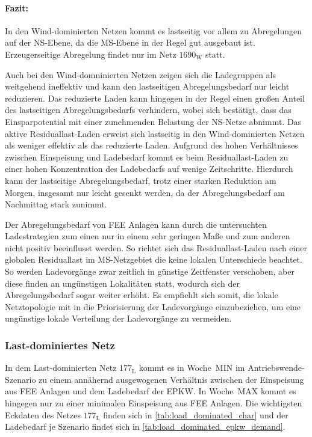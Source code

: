 \paragraph{Fazit:}

In den Wind-dominierten Netzen kommt es lastseitig vor allem zu Abregelungen auf der \gls{NS}-Ebene, da die \gls{MS}-Ebene in der Regel gut ausgebaut ist.
Erzeugerseitige Abregelung findet nur im Netz \(1690_{\text{W}}\) statt.\medskip

Auch bei den Wind-domninierten Netzen zeigen sich die Ladegruppen als weitgehend ineffektiv und kann den lastseitigen Abregelungsbedarf nur leicht reduzieren.
Das reduzierte Laden kann hingegen in der Regel einen großen Anteil des lastseitigen Abregelungsbedarfs verhindern, wobei sich bestätigt, dass das Einsparpotential mit einer zunehmenden Belastung der \gls{NS}-Netze abnimmt.
Das aktive Residuallast-Laden erweist sich lastseitig in den Wind-dominierten Netzen als weniger effektiv als das reduzierte Laden.
Aufgrund des hohen Verhältnisses zwischen Einspeisung und Ladebedarf kommt es beim Residuallast-Laden zu einer hohen Konzentration des Ladebedarfs auf wenige Zeitschritte.
Hierdurch kann der lastseitige Abregelungsbedarf, trotz einer starken Reduktion am Morgen, insgesamt nur leicht gesenkt werden, da der Abregelungsbedarf am Nachmittag stark zunimmt.\medskip

Der Abregelungsbedarf von \gls{FEE} Anlagen kann durch die untersuchten Ladestrategien zum einen nur in einem sehr geringen Maße und zum anderen nicht positiv beeinflusst werden.
So richtet sich das Residuallast-Laden nach einer globalen Residuallast im \gls{MS}-Netzgebiet die keine lokalen Unterschiede beachtet.
So werden Ladevorgänge zwar zeitlich in günstige Zeitfenster verschoben, aber diese finden an ungünstigen Lokalitäten statt, wodurch sich der Abregelungsbedarf sogar weiter erhöht.
Es empfiehlt sich somit, die lokale Netztopologie mit in die Priorisierung der Ladevorgänge einzubeziehen, um eine ungünstige lokale Verteilung der Ladevorgänge zu vermeiden.


\subsubsection{Last-dominiertes Netz}

In dem Last-dominierten Netz \(177_{\text{L}}\) kommt es in Woche~MIN im Antriebswende-Szenario zu einem annähernd ausgewogenen Verhältnis zwischen der Einspeisung aus \gls{FEE} Anlagen und dem Ladebedarf der \gls{EPKW}.
In Woche~MAX kommt es hingegen nur zu einer minimalen Einspeisung aus \gls{FEE} Anlagen.
Die wichtigsten Eckdaten des Netzes \(177_{\text{L}}\) finden sich in \autoref{tab:load_dominated_char} und der Ladebedarf je Szenario findet sich in \autoref{tab:load_dominated_epkw_demand}.

